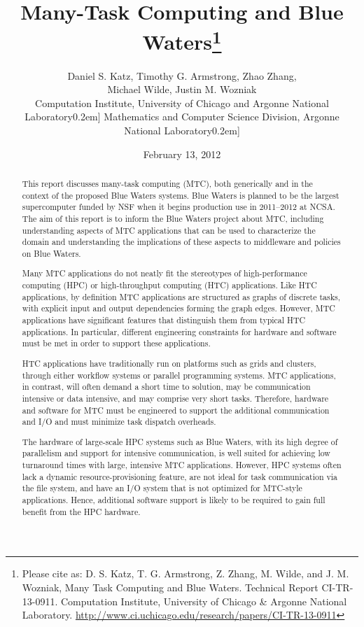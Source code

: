 \documentclass[10pt,letterpaper]{article}
\title{Many-Task Computing and Blue Waters\footnote{Please cite as: D. S. Katz, T. G. Armstrong, Z. Zhang, M. Wilde, and J. M. Wozniak,  Many Task Computing and Blue Waters. Technical Report CI-TR-13-0911. Computation Institute, University of Chicago \& Argonne National Laboratory. \url{http://www.ci.uchicago.edu/research/papers/CI-TR-13-0911}}}
\author{Daniel S. Katz, Timothy G. Armstrong, Zhao Zhang,\\
Michael Wilde, Justin M. Wozniak\\
  \small Computation Institute,
  University of Chicago and Argonne National Laboratory\-0.2em]
  \small Mathematics and Computer Science Division,
  Argonne National Laboratory\-0.2em]
}
\date{February 13, 2012}
\begin{document}
\maketitle

\begin{abstract}
This report discusses many-task computing (MTC), both generically and
in the context of the proposed Blue Waters systems.  Blue Waters is planned to be the largest
supercomputer funded by NSF when
it begins production use in 2011--2012 at NCSA.
The aim of this report is to inform the Blue Waters project about MTC,
including understanding aspects of MTC applications that can be used to
characterize the domain and understanding the implications of these
aspects to middleware and policies on Blue Waters.

Many MTC applications do not neatly fit the stereotypes of
high-performance computing (HPC) or high-throughput computing (HTC)
applications.  Like HTC applications, by definition MTC applications
are structured as graphs of discrete tasks, with explicit input and output
dependencies forming the graph edges.  However, MTC applications have
significant features that distinguish them from typical HTC applications.
In particular, different engineering constraints for hardware and software must be
met in order to support these applications.

HTC applications have traditionally run on platforms such as grids and clusters,
through either workflow systems or parallel programming systems.
MTC applications, in contrast, will
often demand a short time to solution, may be communication intensive or
data intensive, and may comprise very short tasks.
Therefore, hardware and software for MTC must be engineered
to support the additional communication and I/O and must minimize
task dispatch overheads.

The hardware of large-scale HPC systems such as Blue Waters, with its high degree of
parallelism and support for intensive communication, is well suited
for achieving low turnaround times with large, intensive MTC applications.
However, HPC systems often lack a dynamic resource-provisioning
feature, are not ideal for task communication via the file system, and
have an I/O system that is not optimized for MTC-style applications. Hence,
additional software support is likely to be required to gain full benefit
from the HPC hardware.

\end{abstract}


\pagebreak
\end{document}
